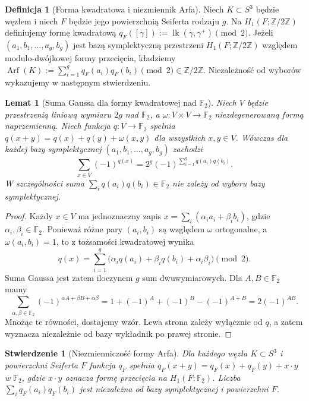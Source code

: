 \documentclass[11pt,a4paper]{report}
\numberwithin{equation}{section}
\theoremstyle{plain}
\newtheorem{lemat}[twierdzenie]{Lemat}
\newtheorem{stwierdzenie}[twierdzenie]{Stwierdzenie}
\theoremstyle{definition}
\newtheorem{definicja}[twierdzenie]{Definicja}
\theoremstyle{remark}
\begin{document}
\begin{definicja}[Forma kwadratowa i niezmiennik Arfa]
Niech $K\subset S^3$ będzie węzłem i niech
$F$ będzie jego powierzchnią Seiferta rodzaju $g$.
Na $H_1(F;\mathbb Z/2\mathbb Z)$ definiujemy
formę kwadratową $q_F([\gamma]):=
\operatorname{lk}(\gamma,\gamma^+)\pmod2$.
Jeżeli $(a_1,b_1,\dots,a_g,b_g)$ jest bazą symplektyczną
przestrzeni $H_1(F;\mathbb Z/2\mathbb Z)$ względem
modulo-dwójkowej formy przecięcia, kładziemy
$\operatorname{Arf}(K):=\sum_{i=1}^{g}q_F(a_i)q_F(b_i)
\pmod2\in\mathbb Z/2\mathbb Z$.
Niezależność od wyborów wykazujemy w następnym stwierdzeniu.
\end{definicja}

\begin{lemat}[Suma Gaussa dla formy kwadratowej nad $\mathbb F_2$]
\label{lem:tg-arf-gauss}
Niech $V$ będzie przestrzenią liniową wymiaru $2g$ nad
$\mathbb F_2$, a $\omega\colon V\times V\to\mathbb F_2$
niezdegenerowaną formą naprzemienną. Niech funkcja
$q\colon V\to\mathbb F_2$ spełnia
$q(x+y)=q(x)+q(y)+\omega(x,y)$ dla wszystkich $x,y\in V$.
Wówczas dla każdej bazy symplektycznej
$(a_1,b_1,\ldots,a_g,b_g)$ zachodzi
\[
\sum_{x\in V}(-1)^{q(x)}
=2^g(-1)^{\sum_{i=1}^g q(a_i)q(b_i)}.
\]
W szczególności suma $\sum_iq(a_i)q(b_i)\in\mathbb F_2$
nie zależy od wyboru bazy symplektycznej.
\end{lemat}

\begin{proof}
Każdy $x\in V$ ma jednoznaczny zapis
$x=\sum_i(\alpha_i a_i+\beta_i b_i)$, gdzie
$\alpha_i,\beta_i\in\mathbb F_2$. Ponieważ różne pary
$(a_i,b_i)$ są względem $\omega$ ortogonalne, a
$\omega(a_i,b_i)=1$, to z tożsamości kwadratowej wynika
\[
q(x)=\sum_{i=1}^g
\bigl(\alpha_i q(a_i)+\beta_i q(b_i)+\alpha_i\beta_i\bigr)
\pmod 2.
\]
Suma Gaussa jest zatem iloczynem $g$ sum dwuwymiarowych.
Dla $A,B\in\mathbb F_2$ mamy
\[
\sum_{\alpha,\beta\in\mathbb F_2}
(-1)^{\alpha A+\beta B+\alpha\beta}
=1+(-1)^A+(-1)^B-(-1)^{A+B}
=2(-1)^{AB}.
\]
Mnożąc te równości, dostajemy wzór. Lewa strona zależy
wyłącznie od $q$, a zatem wyznacza niezależnie od bazy
wykładnik po prawej stronie.
\end{proof}

\begin{stwierdzenie}[Niezmienniczość formy Arfa]
Dla każdego węzła $K\subset S^3$ i powierzchni Seiferta
$F$ funkcja $q_F$ spełnia
$q_F(x+y)=q_F(x)+q_F(y)+x\cdot y$ w $\mathbb F_2$,
gdzie $x\cdot y$ oznacza formę przecięcia na $H_1(F;\mathbb F_2)$.
Liczba $\sum_iq_F(a_i)q_F(b_i)$ jest niezależna od bazy
symplektycznej i powierzchni $F$.
\end{stwierdzenie}
\end{document}
